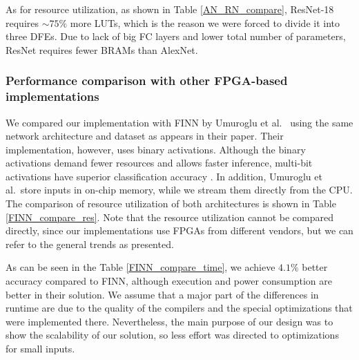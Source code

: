\documentclass[conference]{IEEEtran}
\begin{document}
	As for resource utilization, as shown in Table \ref{AN_RN_compare}, ResNet-18 requires $\sim 75\%$ more LUTs, which is the reason we were forced to divide it into three DFEs. Due to lack of big FC layers and lower total number of parameters, ResNet requires fewer BRAMs than AlexNet. 
	
	\subsubsection{Performance comparison with other FPGA-based implementations}
	\label{Fpga_per}
	
	We compared our implementation with FINN by Umuroglu et al.\ \cite{Umuroglu:2017:FFF:3020078.3021744} using the same network architecture and dataset as appears in their paper. Their implementation, however, uses binary activations. Although the binary activations demand fewer resources and allows faster inference, multi-bit activations have superior classification accuracy \cite{DBLP:journals/corr/ZhouNZWWZ16}.  In addition, Umuroglu et al.\ store inputs in on-chip memory, while we stream them directly from the CPU. The comparison of resource utilization of both architectures is shown in Table \ref{FINN_compare_res}. Note that the resource utilization cannot be compared directly, since our implementations use FPGAs from different vendors, but we can refer to the general trends as presented. 
	
	As can be seen in the Table \ref{FINN_compare_time}, we achieve $4.1\%$ better accuracy compared to FINN, although execution and power consumption are better in their solution. We assume that a major part of the differences in runtime are due to the quality of the compilers and the special optimizations that were implemented there. Nevertheless, the main purpose of our design was to show the scalability of our solution, so less effort was directed to optimizations for small inputs.
	
\end{document}
